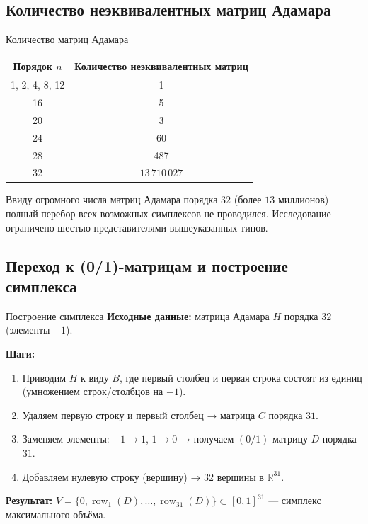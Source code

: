 \documentclass{beamer}
\begin{document}
\subsection{Количество неэквивалентных матриц Адамара} %
\begin{frame}{Количество матриц Адамара}
    \begin{table}
    \centering
    \begin{tabular}{c|c}
    \hline
    Порядок $n$ & Количество неэквивалентных матриц \\
    \hline
    1, 2, 4, 8, 12 & 1 \\
    16 & 5 \\
    20 & 3 \\
    24 & 60 \\
    28 & 487 \\
    32 & $13\,710\,027$ \\
    \hline
    \end{tabular}
    \end{table}

    \vspace{0.3cm}

    Ввиду огромного числа матриц Адамара порядка $32$ (более $13$ миллионов) полный перебор всех возможных симплексов не проводился. Исследование ограничено шестью представителями вышеуказанных типов.
\end{frame}

\subsection{Переход к (0/1)-матрицам и построение симплекса}
\begin{frame}{Построение симплекса}
    \textbf{Исходные данные:} матрица Адамара $H$ порядка $32$ (элементы $\pm 1$).

    \vspace{0.3cm}

    \textbf{Шаги:}
    \begin{enumerate}
        \item Приводим $H$ к виду $B$, где первый столбец и первая строка состоят из единиц (умножением строк/столбцов на $-1$).
        \item Удаляем первую строку и первый столбец → матрица $C$ порядка $31$.
        \item Заменяем элементы: $-1 \to 1$, $1 \to 0$ → получаем $(0/1)$-матрицу $D$ порядка $31$.
        \item Добавляем нулевую строку (вершину) → $32$ вершины в $\mathbb{R}^{31}$.
    \end{enumerate}

    \vspace{0.3cm}

    \textbf{Результат:} $V = \{0, \operatorname{row}_1(D), \dots, \operatorname{row}_{31}(D)\} \subset [0,1]^{31}$ — симплекс максимального объёма.
\end{frame}
\end{document}
